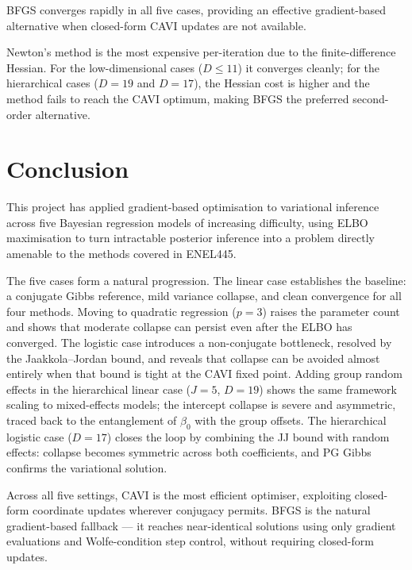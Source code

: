 \documentclass[11pt,a4paper]{article}
\begin{document}
BFGS converges rapidly in all five cases, providing an effective gradient-based
alternative when closed-form CAVI updates are not available.

Newton's method is the most expensive per-iteration due to the finite-difference
Hessian.
For the low-dimensional cases ($D \leq 11$) it converges cleanly; for the hierarchical
cases ($D=19$ and $D=17$), the Hessian cost is higher and the method fails to reach
the CAVI optimum, making BFGS the preferred second-order alternative.

\section*{Conclusion}

This project has applied gradient-based optimisation to variational inference across
five Bayesian regression models of increasing difficulty, using ELBO maximisation to
turn intractable posterior inference into a problem directly amenable to the methods
covered in ENEL445.

The five cases form a natural progression.
The linear case establishes the baseline: a conjugate Gibbs reference, mild variance
collapse, and clean convergence for all four methods.
Moving to quadratic regression ($p=3$) raises the parameter count and shows that
moderate collapse can persist even after the ELBO has converged.
The logistic case introduces a non-conjugate bottleneck, resolved by the
Jaakkola--Jordan bound, and reveals that collapse can be avoided almost entirely when
that bound is tight at the CAVI fixed point.
Adding group random effects in the hierarchical linear case ($J=5$, $D=19$) shows the
same framework scaling to mixed-effects models; the intercept collapse is severe and
asymmetric, traced back to the entanglement of $\beta_0$ with the group offsets.
The hierarchical logistic case ($D=17$) closes the loop by combining the JJ bound
with random effects: collapse becomes symmetric across both coefficients, and PG Gibbs
confirms the variational solution.

Across all five settings, CAVI is the most efficient optimiser, exploiting closed-form
coordinate updates wherever conjugacy permits.
BFGS is the natural gradient-based fallback --- it reaches near-identical solutions
using only gradient evaluations and Wolfe-condition step control, without requiring
closed-form updates.
\end{document}
